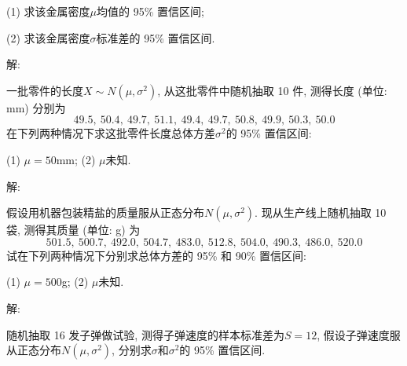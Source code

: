 \documentclass[standard]{ExBook}
\begin{document}
\begin{qitems}
\begin{bbox}
\begin{shaded}
(1) 求该金属密度$\mu$均值的 95\% 置信区间;

(2) 求该金属密度$\sigma$标准差的 95\% 置信区间.
    \end{shaded}
    \end{bbox}

\vspace{-5em}

    \begin{bbox}
解: 
    \end{bbox}

\vspace{-5em}

    \begin{bbox}
    \begin{shaded}
        \qitem
一批零件的长度$X \sim N(\mu,\sigma^2)$, 从这批零件中随机抽取 10 件, 测得长度 (单位: mm) 分别为
$$49.5,\ 50.4,\ 49.7,\ 51.1,\ 49.4,\ 49.7,\ 50.8,\ 49.9,\ 50.3,\ 50.0$$
在下列两种情况下求这批零件长度总体方差$\sigma^2$的 95\% 置信区间:

(1) $\mu = 50$mm; \qquad (2) $\mu$未知.
    \end{shaded}
    \end{bbox}

\vspace{-5em}

    \begin{bbox}
解: 
    \end{bbox}

\vspace{-5em}

    \begin{bbox}
    \begin{shaded}
        \qitem
假设用机器包装精盐的质量服从正态分布$N(\mu,\sigma^2)$. 现从生产线上随机抽取 10 袋, 测得其质量 (单位: g) 为
$$501.5,\ 500.7,\ 492.0,\ 504.7,\ 483.0,\ 512.8,\ 504.0,\ 490.3,\ 486.0,\ 520.0$$
试在下列两种情况下分别求总体方差的 95\% 和 90\% 置信区间:

(1) $\mu=500$g; \qquad (2) $\mu$未知.
    \end{shaded}
    \end{bbox}

\vspace{-5em}

    \begin{bbox}
解: 
    \end{bbox}

\vspace{-5em}

    \begin{bbox}
    \begin{shaded}
        \qitem
随机抽取 16 发子弹做试验, 测得子弹速度的样本标准差为$S = 12$, 假设子弹速度服从正态分布$N(\mu,\sigma^2)$, 分别求$\sigma$和$\sigma^2$的 95\% 置信区间.
    \end{shaded}
    \end{bbox}


\end{qitems}
\end{document}
